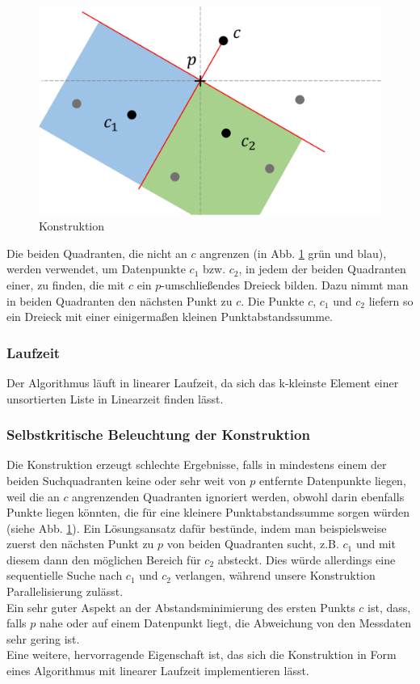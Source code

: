\documentclass[a4paper]{extarticle}
\begin{document}
    \begin{figure}[!ht]
        \centering	
        \includegraphics[scale=0.15]{bilder/tri_konstr.pdf}
        \caption{Konstruktion}
        \label{fig:konstuktion}
    \end{figure}

    Die beiden Quadranten, die nicht an $c$ angrenzen (in Abb. \ref{fig:konstuktion} grün und blau),
    werden verwendet, um Datenpunkte $c_1$ bzw. $c_2$, in jedem der beiden Quadranten einer, zu 
    finden, die mit $c$ ein $p$-umschließendes Dreieck bilden. Dazu nimmt man in beiden Quadranten 
    den nächsten Punkt zu $c$. Die Punkte $c$, $c_1$ und $c_2$ liefern so ein Dreieck mit einer
    einigermaßen kleinen Punktabstandssumme.

    \subsubsection{Laufzeit}
    Der Algorithmus läuft in linearer Laufzeit, da sich das k-kleinste Element einer unsortierten
    Liste in Linearzeit finden lässt. %

    \subsubsection{Selbstkritische Beleuchtung der Konstruktion}
    Die Konstruktion erzeugt schlechte Ergebnisse, falls in mindestens einem der beiden 
    Suchquadranten keine oder sehr weit von $p$ entfernte Datenpunkte liegen, weil die an $c$ 
    angrenzenden Quadranten ignoriert werden, obwohl darin ebenfalls Punkte liegen könnten, die 
    für eine kleinere Punktabstandssumme sorgen würden (siehe Abb. \ref{fig:konstuktion}).
    Ein Lösungsansatz dafür bestünde, indem man beispielsweise zuerst den nächsten Punkt zu $p$ 
    von beiden Quadranten sucht, z.B. $c_1$ und mit diesem dann den möglichen Bereich für $c_2$ 
    absteckt. Dies würde allerdings eine sequentielle Suche nach $c_1$ und $c_2$ verlangen, 
    während unsere Konstruktion Parallelisierung zulässt. \\
    Ein sehr guter Aspekt an der Abstandsminimierung des ersten Punkts $c$ ist, dass, falls $p$ nahe 
    oder auf einem Datenpunkt liegt, die Abweichung von den Messdaten sehr gering ist. \\
    Eine weitere, hervorragende Eigenschaft ist, das sich die Konstruktion in Form eines Algorithmus 
    mit linearer Laufzeit implementieren lässt.
\end{document}

